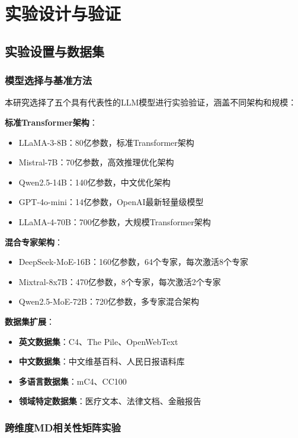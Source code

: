 \section{实验设计与验证}

\subsection{实验设置与数据集}

\subsubsection{模型选择与基准方法}

本研究选择了五个具有代表性的LLM模型进行实验验证，涵盖不同架构和规模：

\textbf{标准Transformer架构}：
\begin{itemize}
\item LLaMA-3-8B：80亿参数，标准Transformer架构
\item Mistral-7B：70亿参数，高效推理优化架构
\item Qwen2.5-14B：140亿参数，中文优化架构
\item GPT-4o-mini：14亿参数，OpenAI最新轻量级模型
\item LLaMA-4-70B：700亿参数，大规模Transformer架构
\end{itemize}

\textbf{混合专家架构}：
\begin{itemize}
\item DeepSeek-MoE-16B：160亿参数，64个专家，每次激活8个专家
\item Mixtral-8x7B：470亿参数，8个专家，每次激活2个专家
\item Qwen2.5-MoE-72B：720亿参数，多专家混合架构
\end{itemize}

\textbf{数据集扩展}：
\begin{itemize}
\item \textbf{英文数据集}：C4、The Pile、OpenWebText
\item \textbf{中文数据集}：中文维基百科、人民日报语料库
\item \textbf{多语言数据集}：mC4、CC100
\item \textbf{领域特定数据集}：医疗文本、法律文档、金融报告
\end{itemize}

\subsubsection{跨维度MD相关性矩阵实验}

